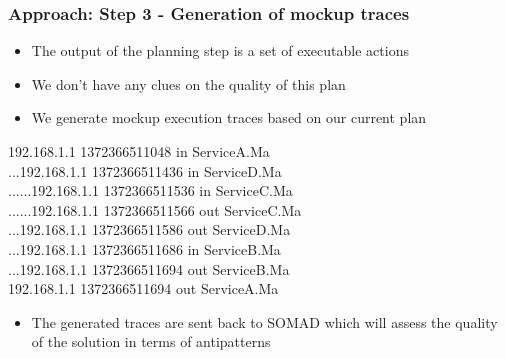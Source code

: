 \documentclass{beamer}
\begin{document}
\begin{frame}
\frametitle{Approach: Step 3 - Generation of mockup traces}
\begin{itemize}
\item The output of the planning step is a set of executable actions
\item We don't have any clues on the quality of this plan
\item We generate mockup execution traces based on our current plan
\end{itemize}
\begin{small}
192.168.1.1 1372366511048 in ServiceA.Ma\\
...192.168.1.1 1372366511436 in ServiceD.Ma\\
......192.168.1.1 1372366511536 in ServiceC.Ma\\
......192.168.1.1 1372366511566 out ServiceC.Ma\\
...192.168.1.1 1372366511586 out ServiceD.Ma\\
...192.168.1.1 1372366511686 in ServiceB.Ma\\
...192.168.1.1 1372366511694 out ServiceB.Ma\\
192.168.1.1 1372366511694 out ServiceA.Ma
\end{small}
\begin{itemize}
\item The generated traces are sent back to SOMAD which will assess the quality
of the solution in terms of antipatterns
\end{itemize}

\end{frame}
\end{document}
